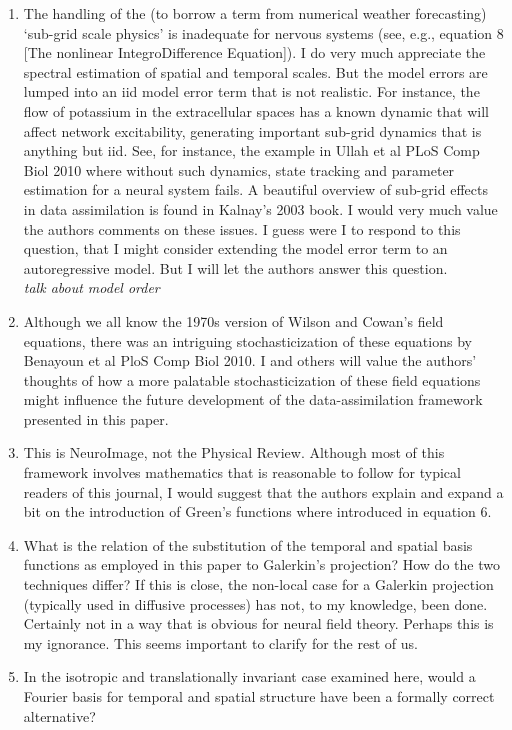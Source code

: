 \documentclass{article}
\begin{document}
\begin{enumerate}
    \item The handling of the (to borrow a term from numerical weather forecasting) `sub-grid scale physics' is inadequate for nervous systems (see, e.g., equation 8 [The nonlinear IntegroDifference Equation]). I do very much appreciate the spectral estimation of spatial and temporal scales. But the model errors are lumped into an iid model error term that is not realistic. For instance, the flow of potassium in the extracellular spaces has a known dynamic that will affect network excitability, generating important sub-grid dynamics that is anything but iid. See, for instance, the example in Ullah et al PLoS Comp Biol 2010 where without such dynamics, state tracking and parameter estimation for a neural system fails. A beautiful overview of sub-grid effects in data assimilation is found in Kalnay's 2003 book. I would very much value the authors comments on these issues. I guess were I to respond to this question, that I might consider extending the model error term to an autoregressive model. But I will let the authors answer this question.\\

    \emph{talk about model order}

\item Although we all know the 1970s version of Wilson and Cowan's field equations, there was an intriguing stochasticization of these equations by Benayoun et al PloS Comp Biol 2010. I and others will value the authors' thoughts of how a more palatable stochasticization of these field equations might influence the future development of the data-assimilation framework presented in this paper.
\item This is NeuroImage, not the Physical Review. Although most of this framework involves mathematics that is reasonable to follow for typical readers of this journal, I would suggest that the authors explain and expand a bit on the introduction of Green's functions where introduced in equation 6.
\item What is the relation of the substitution of the temporal and spatial basis functions as employed in this paper to Galerkin's projection? How do the two techniques differ? If this is close, the non-local case for a Galerkin projection (typically used in diffusive processes) has not, to my knowledge, been done. Certainly not in a way that is obvious for neural field theory. Perhaps this is my ignorance. This seems important to clarify for the rest of us.
\item In the isotropic and translationally invariant case examined here, would a Fourier basis for temporal and spatial structure have been a formally correct alternative?\\


\end{enumerate}
\end{document}
